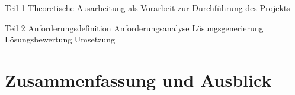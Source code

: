 \documentclass[
a4paper,   
titlepage,  
halfparskip,
12pt        
]{scrartcl}
\begin{document}
\begin{onehalfspacing}
Teil 1
Theoretische Ausarbeitung als Vorarbeit zur Durchführung
des Projekts

Teil 2
Anforderungsdefinition
Anforderungsanalyse
Lösungsgenerierung
Lösungsbewertung
Umsetzung

\section{Zusammenfassung und Ausblick}
\label{sec:ausblick}




\appendix

\newpage


\end{onehalfspacing}
\end{document}
